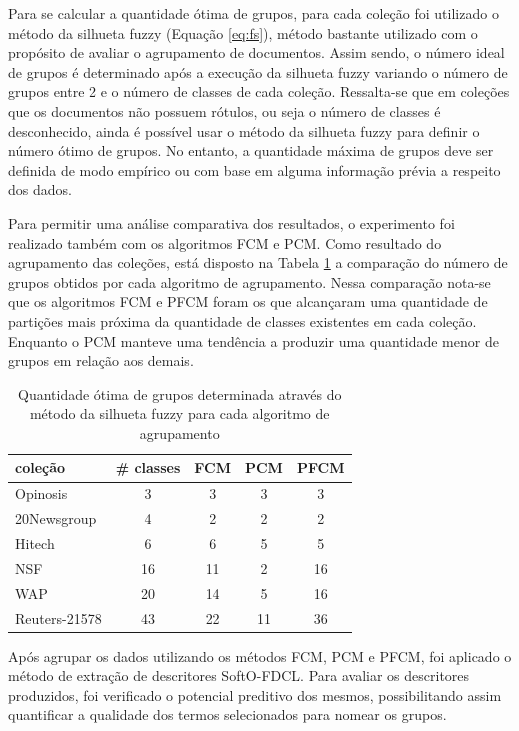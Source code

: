 Para se calcular a quantidade ótima de grupos, para cada coleção foi utilizado o
método da silhueta fuzzy (Equação \ref{eq:fs}), método bastante utilizado com o propósito de avaliar
o agrupamento de documentos. Assim sendo, o número ideal de grupos é determinado após a execução da
silhueta fuzzy variando o número de grupos entre 2 e o número de classes de cada coleção.
Ressalta-se que em coleções que os documentos não possuem rótulos, ou seja o número de classes é
desconhecido, ainda é possível usar o método da silhueta fuzzy para definir o número ótimo de
grupos. No entanto, a quantidade máxima de grupos deve ser definida de modo empírico ou com base em
alguma informação prévia a respeito dos dados. 

Para permitir uma análise comparativa dos resultados, o experimento foi realizado também com os
algoritmos FCM e PCM.  Como resultado do agrupamento das coleções, está disposto na Tabela
\ref{table:pfcmclusters} a comparação do número de grupos obtidos por cada algoritmo de agrupamento.
Nessa comparação nota-se que os algoritmos FCM e PFCM foram os que alcançaram uma quantidade de
partições mais próxima da quantidade de classes existentes em cada coleção. Enquanto o PCM manteve
uma tendência a produzir uma quantidade menor de grupos em relação aos demais.

\begin{table}[!htp]
  \centering
  \begin{tabular}{ |l|c|c|c|c|}
    \hline
    {\bf coleção} & {\bf \# classes} & {\bf FCM} & {\bf PCM} & {\bf PFCM} \\
    \hline
    Opinosis & 3 & 3 & 3 & 3 \\
    \hline
    20Newsgroup & 4 & 2 & 2 & 2 \\
    \hline
    Hitech & 6 & 6 & 5 & 5 \\
    \hline
    NSF & 16 & 11 & 2 & 16 \\
    \hline
    WAP & 20 & 14 & 5 & 16 \\
    \hline
    Reuters-21578 & 43 & 22 & 11 & 36 \\
    \hline
  \end{tabular}
  \caption{Quantidade ótima de grupos determinada através do método da silhueta fuzzy para cada
  algoritmo de agrupamento}
  \label{table:pfcmclusters}
\end{table}

Após agrupar os dados utilizando os métodos FCM, PCM e PFCM, foi aplicado o método de extração 
de descritores SoftO-FDCL. Para avaliar os descritores produzidos, foi verificado o
potencial preditivo dos mesmos, possibilitando assim quantificar a qualidade dos
termos selecionados para nomear os grupos. 

